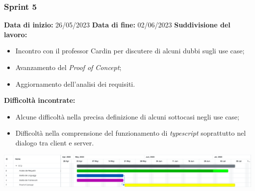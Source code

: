 \documentclass[a4paper, 12pt]{article}
\begin{document}
\subsubsection{Sprint 5}
\textbf{Data di inizio:} 26/05/2023\newline
\textbf{Data di fine:} 02/06/2023\newline
\newline
\textbf{Suddivisione del lavoro:}
\begin{itemize}
    \item Incontro con il professor Cardin per discutere di alcuni dubbi sugli use case;
    \item Avanzamento del \textit{Proof of Concept};
    \item Aggiornamento dell'analisi dei requisiti.
\end{itemize}
\textbf{Difficoltà incontrate:}
\begin{itemize}
    \item Alcune difficoltà nella precisa definizione di alcuni sottocasi negli use case;
    \item Difficoltà nella comprensione del funzionamento di \textit{typescript} soprattutto nel dialogo tra client e server.
\end{itemize}
\includegraphics[scale=0.24]{RTB_4.png}\newline
\newline
\end{document}
